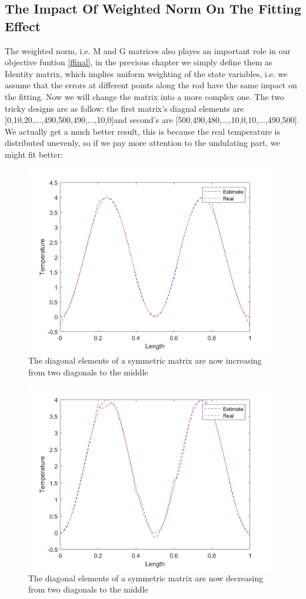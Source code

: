 \documentclass{article}
\begin{document}
\subsection{The Impact Of Weighted Norm On The Fitting Effect}
The weighted norm, i.e. M and G matrices also playes an important role in our objective funtion \ref{ffinal}, in the previous chapter we simply define them as Identity matrix, which implies uniform weighting of the state variables, i.e. we
assume that the errors at different points along the rod have the same impact on the fitting. Now we will change the matrix into a more complex one.
The two tricky designs are as follow:
the first matrix's diagnal elements are [0,10,20,...,490,500,490,...,10,0]and second's are 
[500,490,480,...,10,0,10,...,490,500]. We actually get a much better result, this is because the real temperature is distributed unevenly, so if we pay more attention to the undulating part, we might fit better:
 \begin{figure}[H]
        \centering %
        \includegraphics[width=11cm]{pic/mid_high.png} %
        \caption{The diagonal elements of a symmetric matrix are now increasing from two diagonals to the middle} %
        \label{m1=1000}
    \end{figure} 
    
 \begin{figure}[H]
        \centering %
        \includegraphics[width=11cm]{pic/mid_low.png} %
        \caption{The diagonal elements of a symmetric matrix are now decreasing from two diagonals to the middle} %
        \label{m2=1000}
    \end{figure} 
\end{document}
